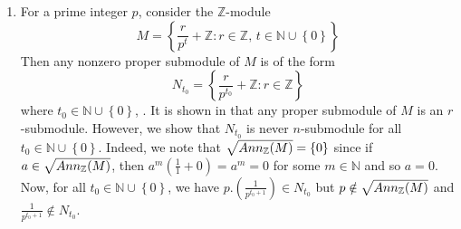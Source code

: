 \documentclass{amsart}%
\providecommand{\U}[1]{\protect\rule{.1in}{.1in}}
\theoremstyle{plain}
\numberwithin{equation}{section}
\begin{document}
\begin{enumerate}
\item For a prime integer $p$, consider the $%
\mathbb{Z}
$-module
\[
M=\left\{  \frac{r}{p^{t}}+%
\mathbb{Z}
:r\in%
\mathbb{Z}
\text{, }t\in%
\mathbb{N}
\cup\left\{  0\right\}  \right\}
\]
Then any nonzero proper submodule of $M$ is of the form%
\[
N_{t_{0}}=\left\{  \frac{r}{p^{t_{0}}}+%
\mathbb{Z}
:r\in%
\mathbb{Z}
\right\}
\]
where $t_{0}\in%
\mathbb{N}
\cup\left\{  0\right\}  $, \cite{Sharp}. It is shown in \cite[Example 2]{Suat}
that any proper submodule of $M$ is an $r$-submodule. However, we show that
$N_{t_{0}}$ is never $n$-submodule for all $t_{0}\in%
\mathbb{N}
\cup\left\{  0\right\}  $. Indeed, we note that $\sqrt{Ann_{%
\mathbb{Z}
}(M)}=\left\{  0\right\}  $ since if $a\in\sqrt{Ann_{%
\mathbb{Z}
}(M)}$, then $a^{m}(\frac{1}{1}+0)=a^{m}=0$ for some $m\in%
\mathbb{N}
$ and so $a=0$. Now, for all $t_{0}\in%
\mathbb{N}
\cup\left\{  0\right\}  $, we have $p.(\frac{1}{p^{t_{0}+1}})\in N_{t_{0}}$
but $p\notin\sqrt{Ann_{%
\mathbb{Z}
}(M)}$ and $\frac{1}{p^{t_{0}+1}}\notin N_{t_{0}}$.


\end{enumerate}
\end{document}

